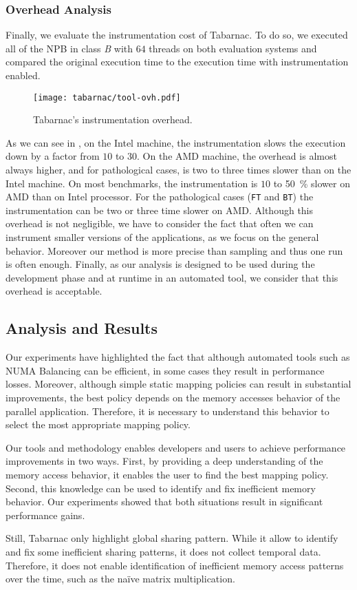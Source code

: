 \subsubsection{Overhead Analysis}

Finally,  we evaluate the instrumentation cost of \gls{Tabarnac}.
To do so, we executed all of the \gls{NPB} in class \emph{B} with $64$ threads on both evaluation systems and compared the original execution time to the execution time with instrumentation enabled.

\begin{figure}[htb]
    \centering
    \texttt{[image: tabarnac/tool-ovh.pdf]}
    \caption{\gls{Tabarnac}'s instrumentation overhead.}
    \label{fig:ovh}
\end{figure}

As we can see in , on the Intel machine, the instrumentation slows the execution down by a factor from $10$ to $30$.
On the AMD machine, the overhead is almost always higher, and for pathological cases, is two to three times slower than on the Intel machine.
On most benchmarks, the instrumentation is $10$ to \SI{50}{\%} slower on AMD than on Intel processor.
For the pathological cases (\texttt{FT} and \texttt{BT}) the instrumentation can be two or three time slower on AMD.
Although this overhead is not negligible, we have to consider the fact that often we can instrument smaller versions of the applications, as we focus on the general behavior.
Moreover our method is more precise than sampling and thus one run is often enough.
Finally, as our analysis is designed to be used during the development phase and at runtime in an automated tool, we consider that this overhead is acceptable.


\subsection{Analysis and Results}

Our experiments have highlighted the fact that although automated tools such as \gls{NUMA} Balancing can be efficient, in some cases they result in performance losses.
Moreover, although simple static mapping policies can result in substantial improvements, the best policy depends on the memory accesses behavior of the parallel application.
Therefore, it is necessary to understand this behavior to select the most appropriate mapping policy.

Our tools and methodology enables developers and users to achieve performance improvements in two ways.
First, by providing a deep understanding of the memory access behavior, it enables the user to find the best mapping policy.
Second, this knowledge can be used to identify and fix inefficient memory behavior.
Our experiments showed that both situations result in significant performance gains.

Still, \gls{Tabarnac} only highlight global sharing pattern.
While it allow to identify and fix some inefficient sharing patterns, it does not collect temporal data.
Therefore, it does not enable identification of inefficient memory access patterns over the time, such as the naïve matrix multiplication.

